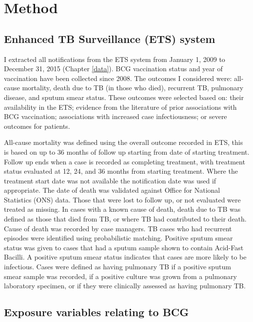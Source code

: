 \documentclass[11pt,twoside]{bristolthesis}
\begin{document}
  \hypertarget{method-3}{%
  \section{Method}\label{method-3}}
  
  \hypertarget{enhanced-tb-surveillance-ets-system}{%
  \subsection{Enhanced TB Surveillance (ETS) system}\label{enhanced-tb-surveillance-ets-system}}
  
  I extracted all notifications from the ETS system from January 1, 2009 to December 31, 2015 (Chapter \ref{data}). BCG vaccination status and year of vaccination have been collected since 2008. The outcomes I considered were: all-cause mortality, death due to TB (in those who died), recurrent TB, pulmonary disease, and sputum smear status. These outcomes were selected based on: their availability in the ETS; evidence from the literature of prior associations with BCG vaccination; associations with increased case infectiousness; or severe outcomes for patients.
  
  All-cause mortality was defined using the overall outcome recorded in ETS, this is based on up to 36 months of follow up starting from date of starting treatment. Follow up ends when a case is recorded as completing treatment, with treatment status evaluated at 12, 24, and 36 months from starting treatment. Where the treatment start date was not available the notification date was used if appropriate. The date of death was validated against Office for National Statistics (ONS) data. Those that were lost to follow up, or not evaluated were treated as missing. In cases with a known cause of death, death due to TB was defined as those that died from TB, or where TB had contributed to their death. Cause of death was recorded by case managers. TB cases who had recurrent episodes were identified using probabilistic matching. Positive sputum smear status was given to cases that had a sputum sample shown to contain Acid-Fast Bacilli. A positive sputum smear status indicates that cases are more likely to be infectious. Cases were defined as having pulmonary TB if a positive sputum smear sample was recorded, if a positive culture was grown from a pulmonary laboratory specimen, or if they were clinically assessed as having pulmonary TB.
  
  \hypertarget{exposure-variables-relating-to-bcg}{%
  \subsection{Exposure variables relating to BCG}\label{exposure-variables-relating-to-bcg}}
  
\end{document}
